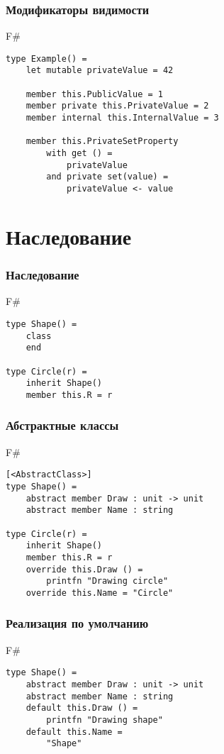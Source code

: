 \documentclass[xetex,mathserif,serif]{beamer}
\begin{document}
   	\begin{frame}[fragile]
   		\frametitle{Модификаторы видимости}
   		\begin{exampleblock}{F\#}
   			\begin{lstlisting}
type Example() = 
    let mutable privateValue = 42

    member this.PublicValue = 1
    member private this.PrivateValue = 2
    member internal this.InternalValue = 3

    member this.PrivateSetProperty 
        with get () = 
            privateValue 
        and private set(value) = 
            privateValue <- value
\end{lstlisting}
\end{exampleblock}
\end{frame}

    \section{Наследование}
    
   	\begin{frame}[fragile]
   		\frametitle{Наследование}
   		\begin{exampleblock}{F\#}
   			\begin{lstlisting}
type Shape() =
    class
    end

type Circle(r) =
    inherit Shape()
    member this.R = r
\end{lstlisting}
\end{exampleblock}
\end{frame}

   	\begin{frame}[fragile]
   		\frametitle{Абстрактные классы}
   		\begin{exampleblock}{F\#}
   			\begin{lstlisting}
[<AbstractClass>]
type Shape() =
    abstract member Draw : unit -> unit
    abstract member Name : string

type Circle(r) =
    inherit Shape()
    member this.R = r
    override this.Draw () = 
        printfn "Drawing circle"
    override this.Name = "Circle"
\end{lstlisting}
\end{exampleblock}
\end{frame}

   	\begin{frame}[fragile]
   		\frametitle{Реализация по умолчанию}
   		\begin{exampleblock}{F\#}
   			\begin{lstlisting}
type Shape() =
    abstract member Draw : unit -> unit
    abstract member Name : string
    default this.Draw () =
        printfn "Drawing shape"
    default this.Name =
        "Shape"
\end{lstlisting}
\end{exampleblock}
\end{frame}
\end{document}
